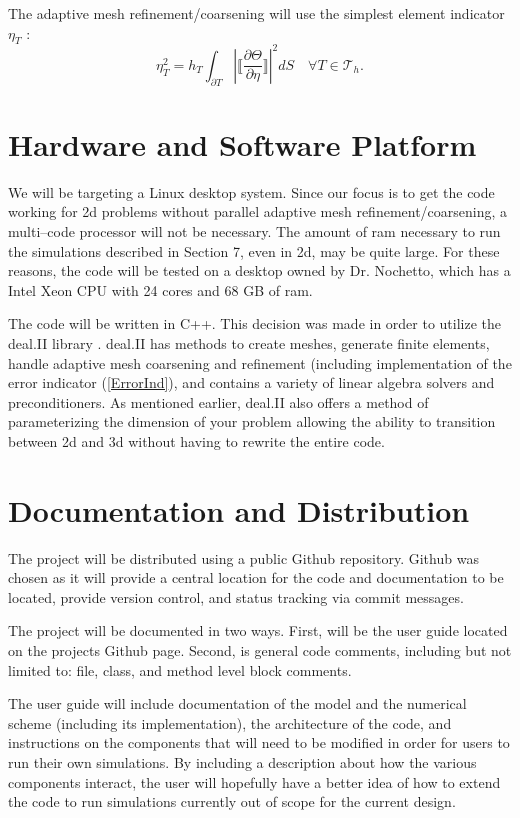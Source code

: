 \documentclass[11pt,fullpage]{article}
\newcommand{\Tau}{\mathcal{T}}
\newcommand{\abs}[1]{\left\vert#1\right\vert}
\theoremstyle{lemma}
\theoremstyle{definition}
\theoremstyle{lemma}
\begin{document}
The adaptive mesh refinement/coarsening will use the simplest element indicator $\eta_T$ \cite{ErrorInd}:
\begin{equation}\label{ErrorInd}
	\eta_T^2 = h_T\int_{\partial T}\abs{\bigg\llbracket\frac{\partial \Theta}{\partial \eta}\bigg\rrbracket}^2dS \quad \forall T\in\Tau_h.
\end{equation}


\section{Hardware and Software Platform}
We will be targeting a Linux desktop system. Since our focus is to get the code working for 2d problems without parallel adaptive mesh refinement/coarsening, a multi--code processor will not be necessary. The amount of ram necessary to run the simulations described in Section 7, even in 2d, may be quite large. For these reasons, the code will be tested on a desktop owned by Dr. Nochetto, which has a Intel Xeon CPU with 24 cores and 68 GB of ram.

The code will be written in C++. This decision was made in order to utilize the deal.II library \cite{AdaptiveMesh:1,DealII}. deal.II has methods to create meshes, generate finite elements, handle adaptive mesh coarsening and refinement (including implementation of the error indicator (\ref{ErrorInd}), and contains a variety of linear algebra solvers and preconditioners. As mentioned earlier, deal.II also offers a method of parameterizing the dimension of your problem allowing the ability to transition between 2d and 3d without having to rewrite the entire code.


\section{Documentation and Distribution}
The project will be distributed using a public Github repository. Github was chosen as it will provide a central location for the code and documentation to be located, provide version control, and status tracking via commit messages.

The project will be documented in two ways. First, will be the user guide located on the projects Github page. Second, is general code comments, including but not limited to: file, class, and method level block comments. 

The user guide will include documentation of the model and the numerical scheme (including its implementation), the architecture of the code, and instructions on the components that will need to be modified in order for users to run their own simulations. By including a description about how the various components interact, the user will hopefully have a better idea of how to extend the code to run simulations currently out of scope for the current design.
\end{document}
